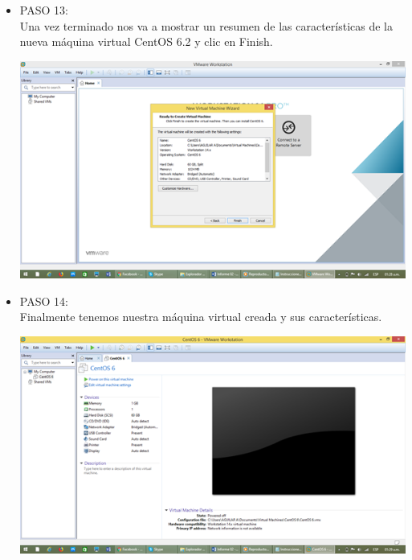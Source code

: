 	\begin{itemize}
\item PASO 13:
\\Una vez terminado nos va a mostrar un resumen de las características de la nueva máquina virtual CentOS 6.2 y clic en Finish.
\\
		\begin{center}
		\includegraphics[width=15cm]{./Imagenes/13}
		\end{center}
	

	\end{itemize} 

	\begin{itemize}
\item PASO 14:
\\Finalmente tenemos nuestra máquina virtual creada y sus características.\\
		\begin{center}
		\includegraphics[width=15cm]{./Imagenes/14}
		\end{center}
	

	\end{itemize} 



\begin{itemize}


  \end{itemize}
  
  


